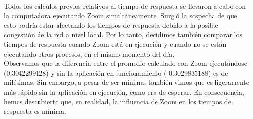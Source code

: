 \documentclass{article}
\begin{document}
        \vspace{0.8cm}
        \\
        Todos los cálculos previos relativos al tiempo de respuesta se llevaron a cabo con la computadora ejecutando Zoom simultáneamente. Surgió la sospecha de que esto podría estar afectando los tiempos de respuesta debido a la posible congestión de la red a nivel local. Por lo tanto, decidimos también comparar los tiempos de respuesta cuando Zoom está en ejecución y cuando no se están ejecutando otros procesos, en el mismo momento del día. \\
        Observamos que la diferencia entre el promedio calculado con Zoom ejecutándose (0.3042299128) y sin la aplicación en funcionamiento ( 0.3029835188) es de milésimas. Sin embargo, a pesar de ser mínima, también vimos que es ligeramente más rápido sin la aplicación en ejecución, como era de esperar. En consecuencia, hemos descubierto que, en realidad, la influencia de Zoom en los tiempos de respuesta es mínima. \\
\end{document}
